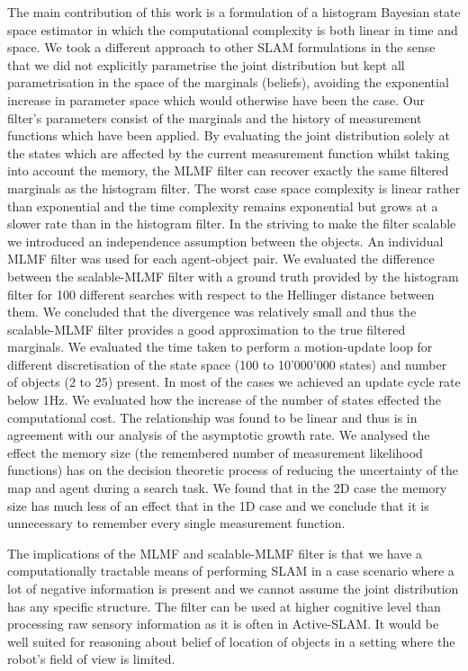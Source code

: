 The main contribution of this work is a formulation of a histogram Bayesian state space estimator in which the computational complexity is 
both linear in time and space. We took a different approach to other SLAM formulations in the sense that we did not
explicitly parametrise the joint distribution but kept all parametrisation in the space of the marginals (beliefs),
avoiding the exponential increase in parameter space which would otherwise have been the case. Our filter's parameters 
consist of the marginals and the history of measurement functions which have been applied. By evaluating the joint 
distribution solely at the states which are affected by the current measurement function whilst taking into account the 
memory, the MLMF filter can recover exactly the same filtered marginals as the histogram filter. The worst case space complexity is 
linear rather than exponential and the time complexity remains exponential but grows at a slower rate than in the histogram filter.
In the striving to make the filter scalable we introduced an independence assumption between the objects. An individual MLMF filter
was used for each agent-object pair. We evaluated the difference between the scalable-MLMF filter with a ground truth provided 
by the histogram filter for 100 different searches with respect to the Hellinger distance between them. We concluded that 
the divergence was relatively small and thus the scalable-MLMF filter provides a good approximation to the true filtered
marginals. We evaluated the time taken to perform a motion-update loop for different discretisation of the state space (100 to 10'000'000 states) and 
number of objects (2 to 25) present. In most of the cases we achieved an update cycle rate below 1Hz. We evaluated how the increase of the number of states 
effected the computational cost. The relationship was found to be linear and thus is in agreement with our analysis of the asymptotic growth rate. 
We analysed the effect the memory size (the remembered number of measurement likelihood functions) has on the decision theoretic process of reducing
the uncertainty of the map and agent during a search task. We found that in the 2D case the memory size has much less of an effect that in the 1D case
and we conclude that it is unnecessary to remember every single measurement function.

The implications of the MLMF and scalable-MLMF filter is that we have a computationally tractable means of 
performing SLAM in a case scenario where a lot of negative information is present and  we cannot assume the 
joint distribution has any specific structure. The filter can be used at higher cognitive level than 
processing raw sensory information as it is often in Active-SLAM. It would be well suited for reasoning about belief 
of location of objects in a setting where the robot's field of view is limited.

